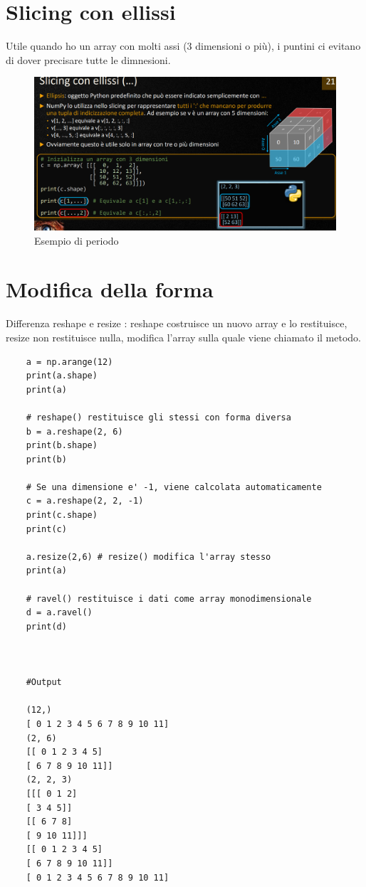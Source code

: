 \newpage

\section{Slicing con ellissi}

Utile quando ho un array con molti assi (3 dimensioni o più), i puntini ci evitano di dover precisare tutte le dimnesioni.

\begin{figure}[htp]
	\includegraphics[width=500pt]{./immagini/slicing_array_multidimensionali2.png}
	\caption{Esempio di periodo}
	\label{img:slicing_array_multidimensionali2}
\end{figure}

\section{Modifica della forma}

Differenza reshape e resize : reshape costruisce un nuovo array e lo restituisce, resize non restituisce nulla, modifica l'array sulla quale viene chiamato il metodo.

\begin{lstlisting}
	a = np.arange(12)
	print(a.shape)
	print(a)

	# reshape() restituisce gli stessi con forma diversa
	b = a.reshape(2, 6)
	print(b.shape)
	print(b)

	# Se una dimensione e' -1, viene calcolata automaticamente
	c = a.reshape(2, 2, -1)
	print(c.shape)
	print(c)

	a.resize(2,6) # resize() modifica l'array stesso
	print(a)

	# ravel() restituisce i dati come array monodimensionale
	d = a.ravel()
	print(d)

	
	
	#Output
	
	(12,)
	[ 0 1 2 3 4 5 6 7 8 9 10 11]
	(2, 6)
	[[ 0 1 2 3 4 5]
	[ 6 7 8 9 10 11]]
	(2, 2, 3)
	[[[ 0 1 2]
	[ 3 4 5]]
	[[ 6 7 8]
	[ 9 10 11]]]
	[[ 0 1 2 3 4 5]
	[ 6 7 8 9 10 11]]
	[ 0 1 2 3 4 5 6 7 8 9 10 11]
	
\end{lstlisting}

